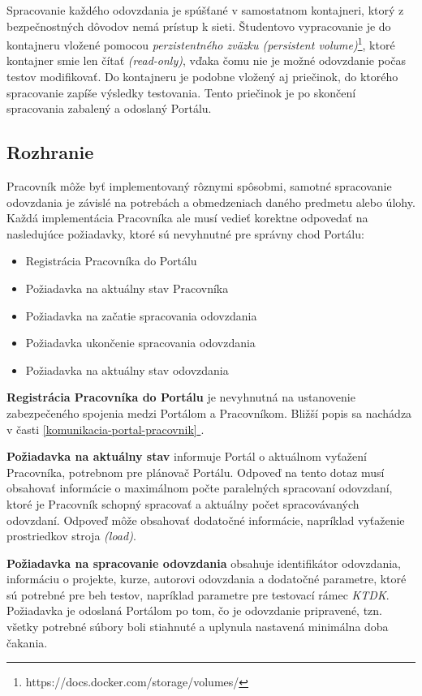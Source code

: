 \documentclass[
  digital, %
  oneside, %
  table,   %
  lof,     %
  lot,   %
]{fithesis3}
\newcommand*{\fullref}[1]{\hyperref[{#1}]{\ref*{#1} \nameref*{#1}}}
\begin{document}
Spracovanie každého odovzdania je spúšťané v samostatnom kontajneri, ktorý z bezpečnostných dôvodov nemá prístup k sieti. Študentovo vypracovanie je do kontajneru vložené pomocou \emph{perzistentného zväzku (persistent volume)}\footnote{https://docs.docker.com/storage/volumes/}, ktoré kontajner smie len čítať \emph{(read-only)}, vďaka čomu nie je možné odovzdanie počas testov modifikovať. Do kontajneru je podobne vložený aj priečinok, do ktorého spracovanie zapíše výsledky testovania. Tento priečinok je po skončení spracovania zabalený a odoslaný Portálu.

\subsection{Rozhranie}

Pracovník môže byť implementovaný rôznymi spôsobmi, samotné spracovanie odovzdania je závislé na potrebách a obmedzeniach daného predmetu alebo úlohy. Každá implementácia Pracovníka ale musí vedieť korektne odpovedať na nasledujúce požiadavky, ktoré sú nevyhnutné pre správny chod Portálu:

\begin{itemize}
    \item Registrácia Pracovníka do Portálu
    \item Požiadavka na aktuálny stav Pracovníka
    \item Požiadavka na začatie spracovania odovzdania
    \item Požiadavka ukončenie spracovania odovzdania
    \item Požiadavka na aktuálny stav odovzdania
\end{itemize}

\textbf{Registrácia Pracovníka do Portálu} je nevyhnutná na ustanovenie zabezpečeného spojenia medzi Portálom a Pracovníkom. Bližší popis sa nachádza v časti \fullref{komunikacia-portal-pracovnik}.

\textbf{Požiadavka na aktuálny stav} informuje Portál o aktuálnom vyťažení Pracovníka, potrebnom pre plánovač Portálu. Odpoveď na tento dotaz musí obsahovať informácie o maximálnom počte paralelných spracovaní odovzdaní, ktoré je Pracovník schopný spracovať a aktuálny počet spracovávaných odovzdaní. Odpoveď môže obsahovať dodatočné informácie, napríklad vyťaženie prostriedkov stroja \emph{(load)}.

\textbf{Požiadavka na spracovanie odovzdania} obsahuje identifikátor odovzdania, informáciu o projekte, kurze, autorovi odovzdania a dodatočné parametre, ktoré sú potrebné pre beh testov, napríklad parametre pre testovací rámec \emph{KTDK}. Požiadavka je odoslaná Portálom po tom, čo je odovzdanie pripravené, tzn. všetky potrebné súbory boli stiahnuté a uplynula nastavená minimálna doba čakania.
\end{document}
